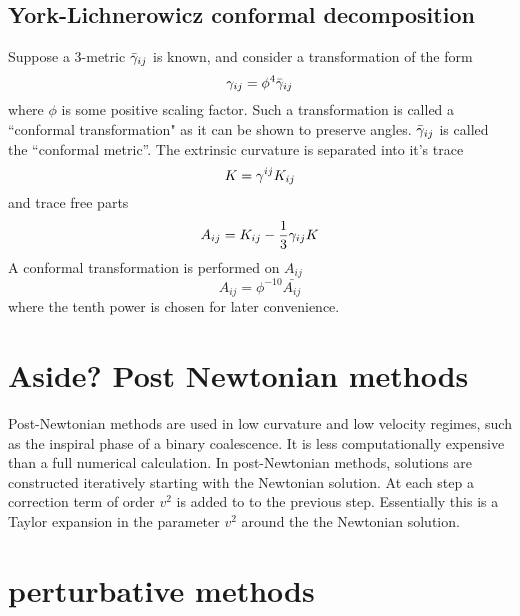 \subsection{York-Lichnerowicz conformal decomposition}
Suppose a 3-metric $\bar{{\gamma}}_{ij}$ is known, and consider a transformation of the form
\[ {\gamma}_{ij}= \phi^4 \bar{{\gamma}}_{ij} \]
where $\phi$ is some positive scaling factor. Such a transformation is called a ``conformal transformation" as it can be shown to preserve angles. $\bar{{\gamma}}_{ij}$ is called the ``conformal metric''. The extrinsic curvature is separated into it's trace
\[ K={\gamma}^{ij} K_{ij} \]
and trace free parts
\[ A_{ij}=K_{ij} - \frac{1}{3} {\gamma}_{ij}K \]
A conformal transformation is performed on $A_{ij}$
\[ A_{ij}=\phi^{-10}\bar{A_{ij}}\]
where the tenth power is chosen for later convenience. 

\section{Aside? Post Newtonian methods}
Post-Newtonian methods are used in low curvature and low velocity regimes, such as the inspiral phase of a binary coalescence. It is less computationally expensive than a full numerical calculation. In post-Newtonian methods, solutions are constructed iteratively starting with the Newtonian solution. At each step a correction term of order $v^2$ is added to to the previous step. Essentially this is a Taylor expansion in the parameter $v^2$ around the the Newtonian solution. 

\section{perturbative methods}




%
